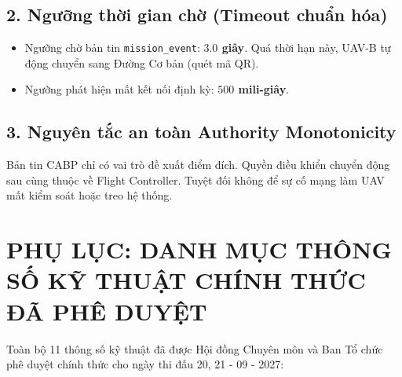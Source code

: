 \documentclass[12pt,a4paper]{article}
\begin{document}
\subsection*{2. Ngưỡng thời gian chờ (Timeout chuẩn hóa)}
\begin{itemize}
\item Ngưỡng chờ bản tin \texttt{mission\_event}: \textbf{$3.0$ giây}. Quá thời hạn này, UAV-B tự động chuyển sang Đường Cơ bản (quét mã QR).
\item Ngưỡng phát hiện mất kết nối định kỳ: \textbf{$500$ mili-giây}.
\end{itemize}

\subsection*{3. Nguyên tắc an toàn Authority Monotonicity}
Bản tin CABP chỉ có vai trò đề xuất điểm đích. Quyền điều khiển chuyển động sau cùng thuộc về Flight Controller. Tuyệt đối không để sự cố mạng làm UAV mất kiểm soát hoặc treo hệ thống.

\section{PHỤ LỤC: DANH MỤC THÔNG SỐ KỸ THUẬT CHÍNH THỨC ĐÃ PHÊ DUYỆT}

Toàn bộ 11 thông số kỹ thuật đã được Hội đồng Chuyên môn và Ban Tổ chức phê duyệt chính thức cho ngày thi đấu 20, 21 - 09 - 2027:
\end{document}
